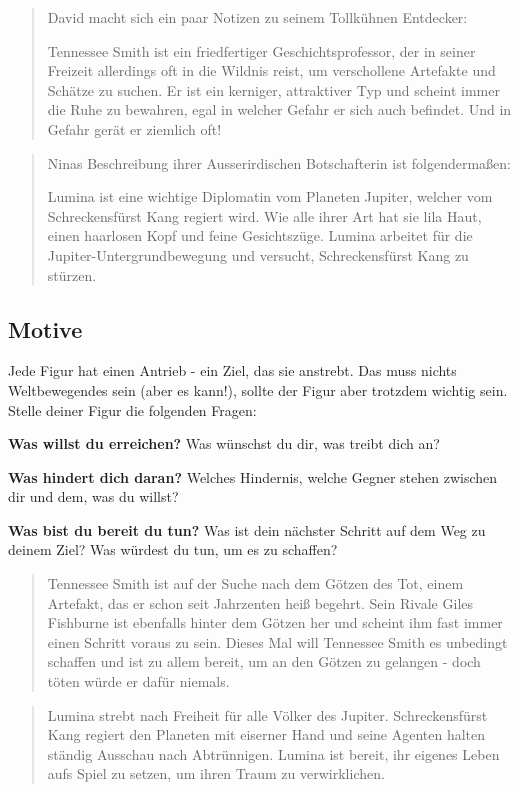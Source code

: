 \documentclass[]{article}
\begin{document}
\begin{quote}
David macht sich ein paar Notizen zu seinem Tollkühnen Entdecker:

Tennessee Smith ist ein friedfertiger Geschichtsprofessor, der in seiner
Freizeit allerdings oft in die Wildnis reist, um verschollene Artefakte
und Schätze zu suchen. Er ist ein kerniger, attraktiver Typ und scheint
immer die Ruhe zu bewahren, egal in welcher Gefahr er sich auch
befindet. Und in Gefahr gerät er ziemlich oft!
\end{quote}

\begin{quote}
Ninas Beschreibung ihrer Ausserirdischen Botschafterin ist
folgendermaßen:

Lumina ist eine wichtige Diplomatin vom Planeten Jupiter, welcher vom
Schreckensfürst Kang regiert wird. Wie alle ihrer Art hat sie lila Haut,
einen haarlosen Kopf und feine Gesichtszüge. Lumina arbeitet für die
Jupiter-Untergrundbewegung und versucht, Schreckensfürst Kang zu
stürzen.
\end{quote}

\subsection{Motive}\label{motive}

Jede Figur hat einen Antrieb - ein Ziel, das sie anstrebt. Das muss
nichts Weltbewegendes sein (aber es kann!), sollte der Figur aber
trotzdem wichtig sein. Stelle deiner Figur die folgenden Fragen:

\textbf{Was willst du erreichen?} Was wünschst du dir, was treibt dich
an?

\textbf{Was hindert dich daran?} Welches Hindernis, welche Gegner stehen
zwischen dir und dem, was du willst?

\textbf{Was bist du bereit du tun?} Was ist dein nächster Schritt auf
dem Weg zu deinem Ziel? Was würdest du tun, um es zu schaffen?

\begin{quote}
Tennessee Smith ist auf der Suche nach dem Götzen des Tot, einem
Artefakt, das er schon seit Jahrzenten heiß begehrt. Sein Rivale Giles
Fishburne ist ebenfalls hinter dem Götzen her und scheint ihm fast immer
einen Schritt voraus zu sein. Dieses Mal will Tennessee Smith es
unbedingt schaffen und ist zu allem bereit, um an den Götzen zu gelangen
- doch töten würde er dafür niemals.
\end{quote}

\begin{quote}
Lumina strebt nach Freiheit für alle Völker des Jupiter. Schreckensfürst
Kang regiert den Planeten mit eiserner Hand und seine Agenten halten
ständig Ausschau nach Abtrünnigen. Lumina ist bereit, ihr eigenes Leben
aufs Spiel zu setzen, um ihren Traum zu verwirklichen.
\end{quote}
\end{document}

